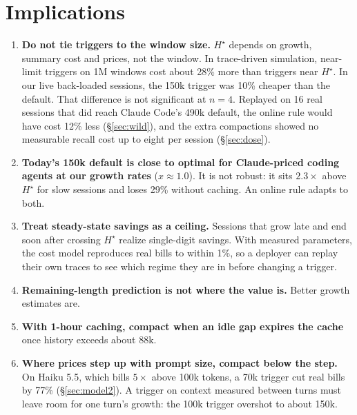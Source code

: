 \documentclass[11pt]{article}
\begin{document}
\begin{table}[t]
\centering
\small
\caption{Cost vs.\ the best fixed threshold in hindsight (\%; lower is better). The gate columns add the horizon gate to the recent-growth rule. Length predictors are fit out of sample (leave-one-out for the real replay). The high-growth row uses the uncompacted runs' real growth, with a predictor fit only on the 25 local sessions.}
\label{tab:horizon}
\resizebox{\linewidth}{!}{}
\end{table}

\section{Implications}
\begin{enumerate}
\item \textbf{Do not tie triggers to the window size.} $H^\star$ depends on growth, summary cost and prices, not the window. In trace-driven simulation, near-limit triggers on 1M windows cost about 28\% more than triggers near $H^\star$. In our live back-loaded sessions, the 150k trigger was 10\% cheaper than the default. That difference is not significant at $n=4$. Replayed on 16 real sessions that did reach Claude Code's 490k default, the online rule would have cost 12\% less (\S\ref{sec:wild}), and the extra compactions showed no measurable recall cost up to eight per session (\S\ref{sec:dose}).
\item \textbf{Today's 150k default is close to optimal for Claude-priced coding agents at our growth rates} ($x\approx1.0$). It is not robust: it sits $2.3\times$ above $H^\star$ for slow sessions and loses 29\% without caching. An online rule adapts to both.
\item \textbf{Treat steady-state savings as a ceiling.} Sessions that grow late and end soon after crossing $H^\star$ realize single-digit savings. With measured parameters, the cost model reproduces real bills to within 1\%, so a deployer can replay their own traces to see which regime they are in before changing a trigger.
\item \textbf{Remaining-length prediction is not where the value is.} Better growth estimates are.
\item \textbf{With 1-hour caching, compact when an idle gap expires the cache} once history exceeds about 88k.
\item \textbf{Where prices step up with prompt size, compact below the step.} On Haiku 5.5, which bills $5\times$ above 100k tokens, a 70k trigger cut real bills by 77\% (\S\ref{sec:model2}). A trigger on context measured between turns must leave room for one turn's growth: the 100k trigger overshot to about 150k.
\end{enumerate}
\end{document}
